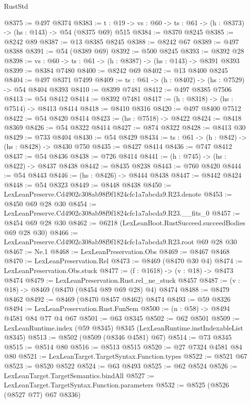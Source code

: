 \begin{lexlean}{RustStd}
\begin{coremodule}
@8375 := @497 @8374
@8383 := {t : @19} -> {vs : @60} -> {ts : @61} -> (h : @8373) -> (hs : @143) -> @54 (@8375 @69) @515
@8384 := @8370 @8245
@8385 := @8242 @89
@8387 := @13 @8385 @8245
@8388 := @8242 @67
@8389 := @497 @8388
@8391 := @54 (@8389 @69)
@8392 := @500 @8245
@8393 := @8392 @28
@8398 := {vs : @60} -> {ts : @61} -> (h : @8387) -> (hs : @143) -> @8391 @8393
@8399 := @8384 @7480
@8400 := @8242 @69
@8402 := @13 @8400 @8245
@8404 := @497 @8371 @7499
@8409 := {ts : @61} -> (h : @8402) -> (hs : @7529) -> @54 @8404 @8393
@8410 := @8399 @7481
@8412 := @497 @8385 @7506
@8413 := @54 @8412
@8414 := @8392 @7481
@8417 := (h : @8318) -> (hs : @7514) -> @8413 @8414
@8418 := @8410 @8316
@8420 := @497 @8400 @7512
@8422 := @54 @8420 @8414
@8423 := (hs : @7518) -> @8422
@8424 := @8418 @8369
@8426 := @54 @8322 @8414
@8427 := @874 @8322
@8428 := @8413 @30
@8429 := @733 @8404
@8430 := @54 @8429
@8434 := {ts : @61} -> (h : @842) -> (hs : @8428) -> @8430 @750
@8435 := @8427 @8414
@8436 := @747 @8412
@8437 := @54 @8436
@8438 := @726 @8414
@8441 := (h : @745) -> (hs : @8422) -> @8437 @8438
@8442 := @8435 @8238
@8443 := @760 @8420
@8444 := @54 @8443
@8446 := (hs : @8426) -> @8444 @8438
@8447 := @8442 @8424
@8448 := @54 @8323
@8449 := @8448 @8438
@8450 := LexLeanPreserve.Cd4902c308ab98f9f1824cfc1a7abcda9.R23.denote
@8453 := @8450 @69 @28 @30
@8454 := LexLeanPreserve.Cd4902c308ab98f9f1824cfc1a7abcda9.R23.__fits_0
@8457 := @8454 @69 @28 @30
@8462 := @6218 (LexLeanBoot.RustSucceed.succeedBodies @69 @28 @30)
@8466 := LexLeanPreserve.Cd4902c308ab98f9f1824cfc1a7abcda9.R23.root @69 @28 @30
@8467 := Ne.{1}
@8468 := LexLeanPreservation.Obs
@8469 := @8467 @8468
@8470 := LexLeanPreservation.Rel
@8473 := @8469 (@8470 @30 @4)
@8474 := LexLeanPreservation.Obs.stuck
@8477 := (f : @1618) -> (v : @18) -> @8473 @8474
@8479 := LexLeanPreservation.Rust.rel_ne_stuck @8457
@8487 := (v : @18) -> @8469 (@8470 (@8454 @89 @69 @28) @4) @8474
@8488 := @8479 @8462
@8492 := @8469 (@8470 @8457 @8462) @8474
@8493 := @59 @8326
@8494 := LexLeanPreservation.Rust.FunSem
@8500 := (n : @58) -> @8494 @4581 @84 @77 @4 @67
@8501 := @63 @8345
@8502 := @62 @8501
@8509 := LexLeanRuntime.index (@59 @8345) @8345 (LexLeanRuntime.instIndexableList @8345)
@8513 := @8502 (@8509 (@8346 @4581) @67)
@8514 := @73 @8345
@8515 := @8514 @80
@8516 := @8513 @8515
@8520 := @27 @7324 @4581 @84 @80
@8521 := LexLeanTarget.TargetSyntax.Function.types
@8522 := @8521 @67
@8523 := @8520 @8522
@8524 := @63 @8493
@8525 := @62 @8524
@8526 := LexLeanTarget.TargetSemantics.bindAll
@8527 := LexLeanTarget.TargetSyntax.Function.parameters
@8532 := @8525 (@8526 (@8527 @77) @67 @8336)

\end{coremodule}
\end{lexlean}
